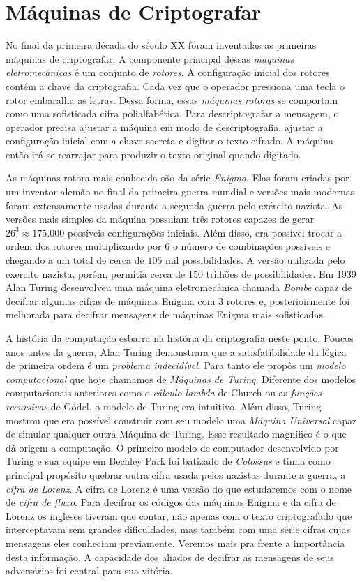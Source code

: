 \section{Máquinas de Criptografar}
\label{sec:maquinas}

No final da primeira década do século XX foram inventadas as primeiras máquinas de criptografar.
A componente principal dessas {\em maquinas eletromecânicas} é um conjunto de {\em rotores}.
A configuração inicial dos rotores contém a chave da criptografia.
Cada vez que o operador pressiona uma tecla o rotor embaralha as letras.
Dessa forma, essas {\em máquinas rotoras} se comportam como uma sofisticada cifra polialfabética.
Para descriptografar a mensagem, o operador precisa ajustar a máquina em modo de descriptografia, ajustar a configuração inicial com a chave secreta e digitar o texto cifrado.
A máquina então irá se rearrajar para produzir o texto original quando digitado.

As máquinas rotora mais conhecida são da série {\em Enigma}.
Elas foram criadas por um inventor alemão no final da primeira guerra mundial e versões mais modernas foram extensamente usadas durante a segunda guerra pelo exército nazista.
As versões mais simples da máquina possuiam três rotores capazes de gerar $26^3 \approx 175.000$ possíveis configurações iniciais.
Além disso, era possível trocar a ordem dos rotores multiplicando por $6$ o número de combinações possíveis e chegando a um total de cerca de $105$ mil possibilidades.
A versão utilizada pelo exercito nazista, porém, permitia cerca de $150$ trilhões de possibilidades.
Em 1939 Alan Turing desenvolveu uma máquina eletromecânica chamada {\em Bombe} capaz de decifrar algumas cifras de máquinas Enigma com 3 rotores e, posterioirmente foi melhorada para decifrar mensagens de máquinas Enigma mais sofisticadas.

A história da computação esbarra na história da criptografia neste ponto.
Poucos anos antes da guerra, Alan Turing demonstrara que a satisfatibilidade da lógica de primeira ordem é um {\em problema indecidível}.
Para tanto ele propôs um {\em modelo computacional} que hoje chamamos de {\em Máquinas de Turing}.
Diferente dos modelos computacionais anteriores como o {\em cálculo lambda} de Church ou as {\em funções recursivas} de Gödel, o modelo de Turing era intuitivo.
Além disso, Turing mostrou que era possível construir com seu modelo uma {\em Máquina Universal} capaz de simular qualquer outra Máquina de Turing.
Esse resultado magnífico é o que dá origem a computação.
O primeiro modelo de computador desenvolvido por Turing e sua equipe em Bechley Park foi batizado de {\em Colossus} e tinha como principal propósito quebrar outra cifra usada pelos nazistas durante a guerra, a {\em cifra de Lorenz}.
A cifra de Lorenz é uma versão do que estudaremos com o nome de {\em cifra de fluxo}.
Para decifrar os códigos das máquinas Enigma e da cifra de Lorenz os ingleses tiveram que contar, não apenas com o texto criptografado que interceptavam sem grandes dificuldades, mas também com uma série cifras cujas mensagens eles conheciam previamente.
Veremos mais pra frente a importância desta informação. 
A capacidade dos aliados de decifrar as mensagens de seus adversários foi central para sua vitória. 

